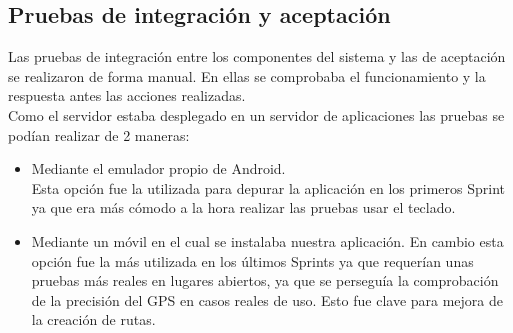 \subsection{Pruebas de integración y aceptación}
Las pruebas de integración entre los componentes del sistema y las de aceptación se realizaron de forma manual. En ellas se comprobaba el funcionamiento y la respuesta antes las acciones realizadas.\\
Como el servidor estaba desplegado en un servidor de aplicaciones las pruebas se podían realizar de 2 maneras:
\begin{itemize}
\item Mediante el emulador propio de Android.\\
Esta opción fue la utilizada para depurar la aplicación en los primeros Sprint ya que era más cómodo a la hora realizar las pruebas usar el teclado.
\item  Mediante un móvil en el cual se instalaba nuestra aplicación. En cambio esta opción  fue la más utilizada en los últimos Sprints ya que requerían unas pruebas más reales en  lugares abiertos, ya que se perseguía la comprobación de la precisión del GPS  en casos reales de uso. Esto fue clave para mejora de la creación de rutas.
\end{itemize}








